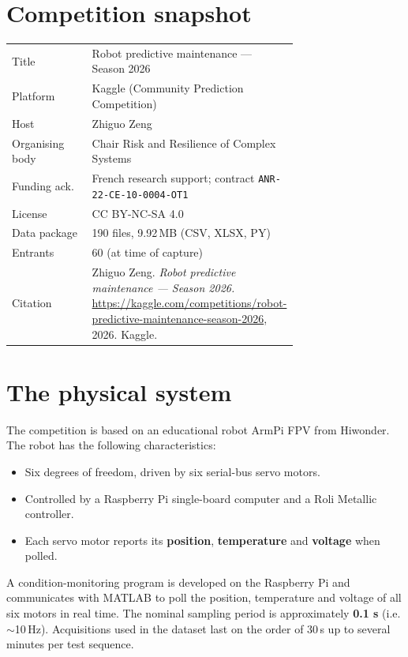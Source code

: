 \documentclass[11pt,a4paper]{article}
\begin{document}
\section{Competition snapshot}
\label{sec:snapshot}

\begin{tabular}{@{}lp{0.72\linewidth}@{}}
\toprule
Title          & Robot predictive maintenance --- Season 2026 \\
Platform       & Kaggle (Community Prediction Competition) \\
Host           & Zhiguo Zeng \\
Organising body& Chair Risk and Resilience of Complex Systems \\
Funding ack.   & French research support; contract \texttt{ANR-22-CE-10-0004-OT1} \\
License        & CC BY-NC-SA 4.0 \\
Data package   & 190 files, 9.92\,MB (CSV, XLSX, PY) \\
Entrants       & 60 (at time of capture) \\
Citation       & Zhiguo Zeng. \emph{Robot predictive maintenance --- Season 2026.}
                 \url{https://kaggle.com/competitions/robot-predictive-maintenance-season-2026}, 2026. Kaggle. \\
\bottomrule
\end{tabular}

\section{The physical system}
\label{sec:robot}

The competition is based on an educational robot ArmPi FPV from Hiwonder. The
robot has the following characteristics:

\begin{itemize}[leftmargin=1.4em]
  \item Six degrees of freedom, driven by six serial-bus servo motors.
  \item Controlled by a Raspberry Pi single-board computer and a Roli Metallic
        controller.
  \item Each servo motor reports its \textbf{position}, \textbf{temperature} and
        \textbf{voltage} when polled.
\end{itemize}

A condition-monitoring program is developed on the Raspberry Pi and
communicates with MATLAB to poll the position, temperature and voltage of all
six motors in real time. The nominal sampling period is approximately
\textbf{0.1 s} (i.e. $\sim$10\,Hz). Acquisitions used in the dataset last on
the order of 30\,s up to several minutes per test sequence.
\end{document}
